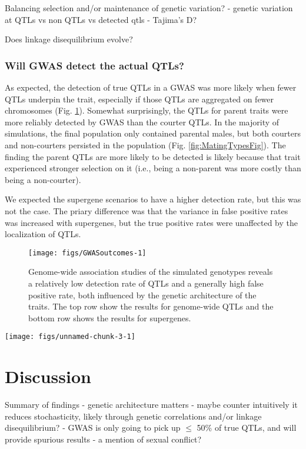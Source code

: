 \documentclass[11pt,]{article}
\begin{document}
Balancing selection and/or maintenance of genetic variation?
- genetic variation at QTLs vs non QTLs vs detected qtls
- Tajima's D?

Does linkage disequilibrium evolve?

\hypertarget{will-gwas-detect-the-actual-qtls}{%
\subsubsection{Will GWAS detect the actual QTLs?}\label{will-gwas-detect-the-actual-qtls}}

As expected, the detection of true QTLs in a GWAS was more likely when fewer QTLs underpin the trait, especially if those QTLs are aggregated on fewer chromosomes (Fig. \ref{fig:GWASoutcomes}). Somewhat surprisingly, the QTLs for parent traits were more reliably detected by GWAS than the courter QTLs. In the majority of simulations, the final population only contained parental males, but both courters and non-courters persisted in the population (Fig. \ref{fig:MatingTypesFig}). The finding the parent QTLs are more likely to be detected is likely because that trait experienced stronger selection on it (i.e., being a non-parent was more costly than being a non-courter).

We expected the supergene scenarios to have a higher detection rate, but this was not the case. The priary difference was that the variance in false positive rates was increased with supergenes, but the true positive rates were unaffected by the localization of QTLs.

\begin{figure}[H]
\texttt{[image: figs/GWASoutcomes-1]} \caption{Genome-wide association studies of the simulated genotypes reveals a relatively low detection rate of QTLs and a generally high false positive rate, both influenced by the genetic architecture of the traits. The top row show the results for genome-wide QTLs and the bottom row shows the results for supergenes.}\label{fig:GWASoutcomes}
\end{figure}

\texttt{[image: figs/unnamed-chunk-3-1]}

\hypertarget{discussion}{%
\section{Discussion}\label{discussion}}

Summary of findings
- genetic architecture matters
- maybe counter intuitively it reduces stochasticity, likely through genetic correlations and/or linkage disequilibrium?
- GWAS is only going to pick up \(\le\) 50\% of true QTLs, and will provide spurious results
- a mention of sexual conflict?
\end{document}
